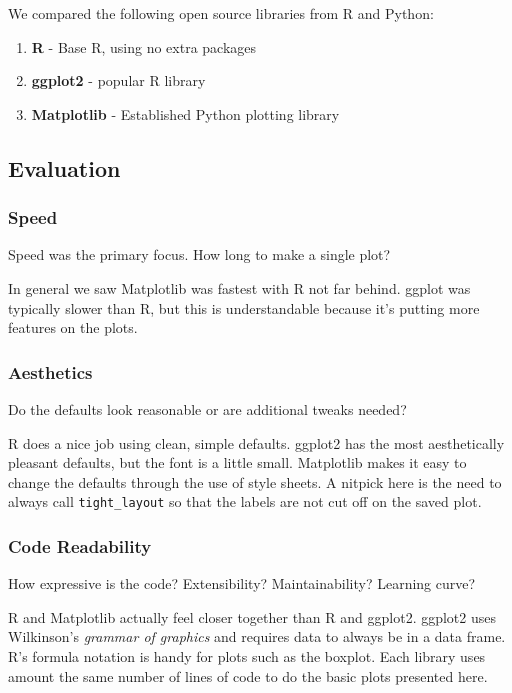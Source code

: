 \documentclass[]{article}
\begin{document}
We compared the following open source libraries from R and Python:

\begin{enumerate}
\def\labelenumi{\arabic{enumi}.}
\itemsep1pt\parskip0pt
\item
  \textbf{R} - Base R, using no extra packages
\item
  \textbf{ggplot2} - popular R library
\item
  \textbf{Matplotlib} - Established Python plotting library
\end{enumerate}

\subsection{Evaluation}\label{evaluation}

\subsubsection{Speed}\label{speed}

Speed was the primary focus. How long to make a single plot?

In general we saw Matplotlib was fastest with R not far behind. ggplot
was typically slower than R, but this is understandable because it's
putting more features on the plots.

\subsubsection{Aesthetics}\label{aesthetics}

Do the defaults look reasonable or are additional tweaks needed?

R does a nice job using clean, simple defaults. ggplot2 has the most
aesthetically pleasant defaults, but the font is a little small.
Matplotlib makes it easy to change the defaults through the use of style
sheets. A nitpick here is the need to always call \texttt{tight\_layout}
so that the labels are not cut off on the saved plot.

\subsubsection{Code Readability}\label{code-readability}

How expressive is the code? Extensibility? Maintainability? Learning
curve?

R and Matplotlib actually feel closer together than R and ggplot2.
ggplot2 uses Wilkinson's \emph{grammar of graphics} and requires data to
always be in a data frame. R's formula notation is handy for plots such
as the boxplot. Each library uses amount the same number of lines of
code to do the basic plots presented here.
\end{document}
